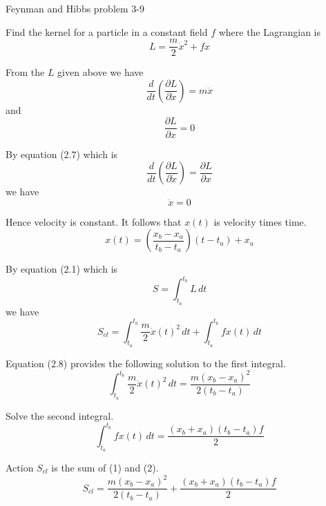 \documentclass[12pt]{article}
\begin{document}
Feynman and Hibbs problem 3-9

\bigskip
Find the kernel for a particle in a constant field $f$
where the Lagrangian is
\begin{equation*}
L=\frac{m}{2}\dot x^2+fx
\end{equation*}

From the $L$ given above we have
\begin{equation*}
\frac{d}{dt}\left(\frac{\partial L}{\partial\dot x}\right)=m\ddot x
\end{equation*}
and
\begin{equation*}
\frac{\partial L}{\partial x}=0
\end{equation*}

By equation (2.7) which is
\begin{equation*}
\frac{d}{dt}\left(\frac{\partial L}{\partial\dot x}\right)=\frac{\partial L}{\partial x}
\end{equation*}
we have
\begin{equation*}
\ddot x=0
\end{equation*}

Hence velocity is constant. It follows that $x(t)$ is velocity times time.
\begin{equation*}
x(t)=\left(\frac{x_b-x_a}{t_b-t_a}\right)(t-t_a)+x_a
\end{equation*}

By equation (2.1) which is
\begin{equation*}
S=\int_{t_a}^{t_b} L\,dt
\end{equation*}
we have
\begin{equation*}
S_{cl}=\int_{t_a}^{t_b}\frac{m}{2}\dot x(t)^2\,dt
+\int_{t_a}^{t_b}fx(t)\,dt
\end{equation*}

Equation (2.8) provides the following solution to the first integral.
\begin{equation*}
\int_{t_a}^{t_b}\frac{m}{2}\dot x(t)^2\,dt
=\frac{m(x_b-x_a)^2}{2(t_b-t_a)}
\tag{1}
\end{equation*}


Solve the second integral.
\begin{equation*}
\int_{t_a}^{t_b}fx(t)\,dt=\frac{(x_b+x_a)(t_b-t_a)f}{2}
\tag{2}
\end{equation*}


Action $S_{cl}$ is the sum of (1) and (2).
\begin{equation*}
S_{cl}=\frac{m(x_b-x_a)^2}{2(t_b-t_a)}+\frac{(x_b+x_a)(t_b-t_a)f}{2}
\end{equation*}
\end{document}
